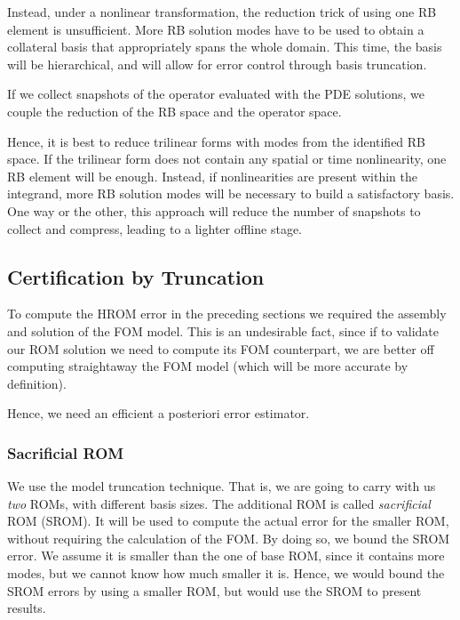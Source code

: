 \documentclass[../../thesis.tex]{subfiles}
\begin{document}
Instead, under a nonlinear transformation,
the reduction trick of using one RB element is unsufficient.
More RB solution modes have to be used to obtain 
a collateral basis that appropriately spans the whole domain.
This time, the basis will be hierarchical, 
and will allow for error control through basis truncation.

If we collect snapshots of the operator evaluated with the PDE solutions,
we couple the reduction of the RB space and the operator space.

Hence, it is best to reduce trilinear forms with modes from the identified RB space.
If the trilinear form does not contain any spatial or time nonlinearity, 
one RB element will be enough.
Instead, if nonlinearities are present within the integrand, more RB solution modes will be necessary 
to build a satisfactory basis.
One way or the other, this approach will reduce the number of snapshots to collect and compress,
leading to a lighter offline stage.

\newpage
\subsection{Certification by Truncation}
\label{sec:hrom_results_posteriori_error_estimation}
To compute the HROM error in the preceding sections
we required the assembly and solution of the FOM model.
This is an undesirable fact, since if to validate our ROM solution
we need to compute its FOM counterpart, 
we are better off computing straightaway the FOM model 
(which will be more accurate by definition).

Hence, we need an efficient a posteriori error estimator.

\subsubsection{Sacrificial ROM}
We use the model truncation technique.
That is, we are going to carry with us \textit{two} ROMs,
with different basis sizes.
The additional ROM is called \textit{sacrificial} ROM (SROM).
It will be used to compute the actual error for the smaller ROM,
without requiring the calculation of the FOM.
By doing so, we bound the SROM error.
We assume it is smaller than the one of base ROM, since it contains more modes,
but we cannot know how much smaller it is.
Hence, we would bound the SROM errors by using a smaller ROM, 
but would use the SROM to present results.
\end{document}

